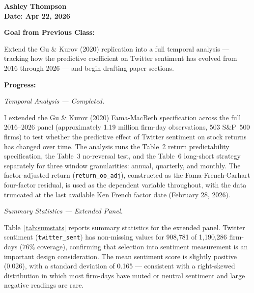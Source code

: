\documentclass[12pt]{article}
\begin{document}
\noindent\textbf{Ashley Thompson}\\
\textbf{Date: Apr 22, 2026}

\bigskip

\noindent\textbf{Goal from Previous Class:}

Extend the Gu \& Kurov (2020) replication into a full temporal analysis --- tracking how the
predictive coefficient on Twitter sentiment has evolved from 2016 through 2026 --- and begin
drafting paper sections.

\bigskip

\noindent\textbf{Progress:}

\noindent\textit{Temporal Analysis --- Completed.}

I extended the Gu \& Kurov (2020) Fama-MacBeth specification across the full 2016--2026 panel
(approximately 1.19 million firm-day observations, 503 S\&P~500 firms) to test whether the
predictive effect of Twitter sentiment on stock returns has changed over time. The analysis runs
the Table~2 return predictability specification, the Table~3 no-reversal test, and the Table~6
long-short strategy separately for three window granularities: annual, quarterly, and monthly. The
factor-adjusted return (\texttt{return\_oo\_adj}), constructed as the Fama-French-Carhart
four-factor residual, is used as the dependent variable throughout, with the data truncated at the
last available Ken French factor date (February 28, 2026).

\medskip

\noindent\textit{Summary Statistics --- Extended Panel.}

Table~\ref{tab:sumstats} reports summary statistics for the extended panel. Twitter sentiment
(\texttt{twitter\_sent}) has non-missing values for 908,781 of 1,190,286 firm-days (76\%
coverage), confirming that selection into sentiment measurement is an important design
consideration. The mean sentiment score is slightly positive (0.026), with a standard deviation
of 0.165 --- consistent with a right-skewed distribution in which most firm-days have muted or
neutral sentiment and large negative readings are rare.
\end{document}
